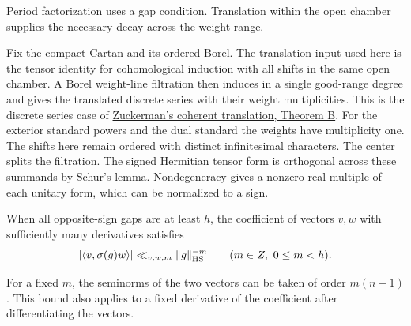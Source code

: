 Period factorization uses a gap condition. Translation within the open chamber supplies the necessary decay across the weight range.

Fix the compact Cartan and its ordered Borel. The translation
input used here is the tensor identity for cohomological
induction with all shifts in the same open chamber. A Borel
weight-line filtration then induces in a single good-range degree
and gives the translated discrete series with their weight
multiplicities. This is the discrete series case of \href{https://www.mathunion.org/fileadmin/ICM/Proceedings/ICM1978.2/ICM1978.2.ocr.pdf}{Zuckerman's coherent translation, Theorem B}.
For the exterior standard powers and the dual standard the weights
have multiplicity one. The shifts here remain ordered with distinct
infinitesimal characters. The center splits the filtration. The
signed Hermitian tensor form is orthogonal across these summands by
Schur's lemma. Nondegeneracy gives a nonzero real multiple of each
unitary form, which can be normalized to a sign.

\begin{proposition}\label{prop:bessel-sign-gap-decay}
When all opposite-sign gaps are at least \(h\), the coefficient of vectors \(v,w\) with sufficiently many derivatives satisfies 
\[
 |\langle v,\sigma(g)w\rangle|\ll_{v,w,m}\|g\|_{\rm HS}^{-m}\qquad(m\in\mathbb Z,\ 0\le m<h).
\]

For a fixed \(m\), the seminorms of the two vectors can be taken of
order \(m(n-1)\). This bound also applies to a fixed derivative of
the coefficient after differentiating the vectors.
\end{proposition}

